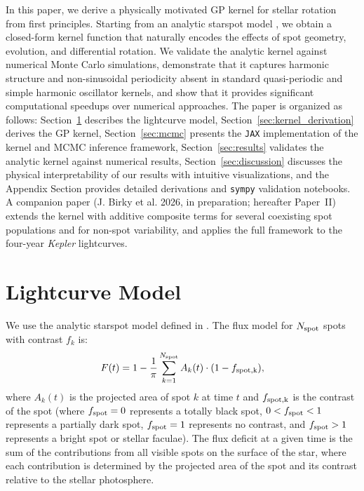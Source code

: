 \documentclass[preprint]{aastex702}
\newcommand{\kepler}{{\it Kepler}\xspace}
\newcommand{\code}[1]{{\texttt{#1}}}
\begin{document}
In this paper, we derive a physically motivated GP kernel for stellar rotation from first principles. Starting from an analytic starspot model \citep{kipping_analytic_2012}, we obtain a closed-form kernel function that naturally encodes the effects of spot geometry, evolution, and differential rotation. We validate the analytic kernel against numerical Monte Carlo simulations, demonstrate that it captures harmonic structure and non-sinusoidal periodicity absent in standard quasi-periodic and simple harmonic oscillator kernels, and show that it provides significant computational speedups over numerical approaches. The paper is organized as follows: Section~\ref{sec:lightcurve} describes the lightcurve model, Section~\ref{sec:kernel_derivation} derives the GP kernel, Section~\ref{sec:mcmc} presents the \code{JAX} implementation of the kernel and MCMC inference framework, Section~\ref{sec:results} validates the analytic kernel against numerical results, Section~\ref{sec:discussion} discusses the physical interpretability of our results with intuitive visualizations, and the Appendix Section provides detailed derivations and \code{sympy} validation notebooks. A companion paper (J. Birky et al. 2026, in preparation; hereafter Paper~II) extends the kernel with additive composite terms for several coexisting spot populations and for non-spot variability, and applies the full framework to the four-year \kepler lightcurves.

\vspace{\baselineskip}
\section{Lightcurve Model} \label{sec:lightcurve}

We use the analytic starspot model defined in \citet{kipping_analytic_2012}. The flux model for $N_{\rm spot}$ spots with contrast $f_k$ is:
\begin{equation}
    F(t) = 1 - \frac{1}{\pi} \sum_{k=1}^{N_{\rm spot}} A_k(t) \cdot (1 - f_{\rm spot,k}),
    \label{eqn:flux_model}
\end{equation}
where $A_k(t)$ is the projected area of spot $k$ at time $t$ and $f_{\rm spot,k}$ is the contrast of the spot (where $f_{\rm spot} = 0$ represents a totally black spot, $0 < f_{\rm spot} < 1$ represents a partially dark spot, $f_{\rm spot} = 1$ represents no contrast, and $f_{\rm spot} > 1$ represents a bright spot or stellar faculae). The flux deficit at a given time is the sum of the contributions from all visible spots on the surface of the star, where each contribution is determined by the projected area of the spot and its contrast relative to the stellar photosphere. 
\end{document}
